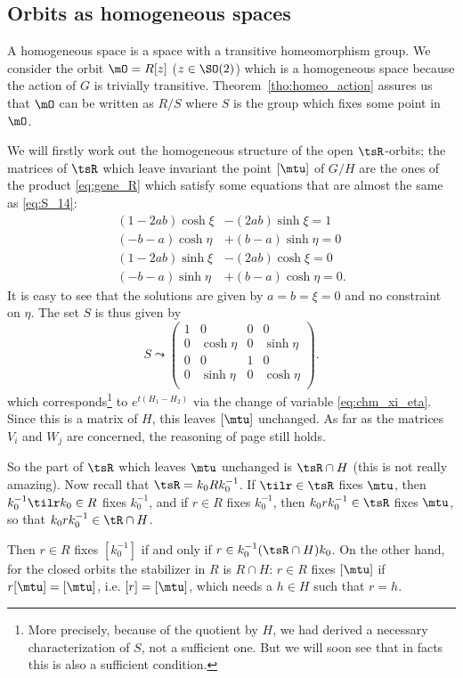 \subsection{Orbits as homogeneous spaces}
A homogeneous space is a space with a transitive homeomorphism group. We consider the orbit $\mO=R[z]$ ($z\in \SO(2)$) which is a homogeneous space because the action of $G$ is trivially transitive. Theorem~\ref{tho:homeo_action} assures us that $\mO$ can be written as $R/S$ where $S$ is the group which fixes some point in $\mO$.

We will firstly work out the homogeneous structure of the open $\tsR$-orbits; the matrices of $\tsR$ which leave invariant the point $[\mtu]$ of $G/H$ are the ones of the product \eqref{eq:gene_R} which satisfy some equations that are almost the same as \eqref{eq:S_14}:
\begin{subequations}
\begin{align}
  (1-2ab)\cosh\xi&-(2ab)\sinh\xi=1   \\
  (-b-a)\cosh\eta&+(b-a)\sinh\eta=0   \\
  (1-2ab)\sinh\xi&-(2ab)\cosh\xi=0    \\
  (-b-a)\sinh\eta&+(b-a)\cosh\eta=0.
\end{align}
\end{subequations}
It is easy to see that the solutions are given by $a=b=\xi=0$ and no constraint on $\eta$. The set $S$ is thus given by
\begin{equation}
S\leadsto
\begin{pmatrix}
 1 & 0 & 0 & 0 \\
 0 & \cosh\eta & 0 & \sinh\eta \\
 0 & 0 & 1 & 0 \\
 0 & \sinh\eta & 0 & \cosh\eta \\
\end{pmatrix}.
\end{equation}
which corresponds\footnote{More precisely, because of the quotient by $H$, we had derived a necessary characterization of $S$, not a sufficient one. But we will soon see that in facts this is also a sufficient condition.} to $ e^{t(H_{1}-H_{2})}$ via the change of variable \eqref{eq:chm_xi_eta}. Since this is a matrix of $H$, this leaves $[\mtu]$ unchanged. As far as the matrices $V_i$ and $W_j$ are concerned, the reasoning of page \pageref{pg:influence_V_W} still holds.

So the part of $\tsR$ which leaves $\mtu$ unchanged is $\tsR\cap H$ (this is not really amazing). Now recall that $\tsR=k_0Rk_0^{-1}$. If $\tilr\in\tsR$ fixes $\mtu$, then $k_0^{-1}\tilr k_0\in R$ fixes $k_0^{-1}$, and if $r\in R$ fixes $k_0^{-1}$, then $k_0rk_0^{-1}\in\tsR$ fixes $\mtu$, so that $k_0rk_0^{-1}\in\tR\cap H$.

Then $r\in R$ fixes $[k_0^{-1}]$ if and only if $r\in k_0^{-1}(\tsR\cap H)k_0$. On the other hand, for the closed orbits the stabilizer in $R$ is $R\cap H$: $r\in R$ fixes $[\mtu]$ if $r[\mtu]=[\mtu]$, i.e. $[r]=[\mtu]$, which needs a $h\in H$ such that $r=h$.
